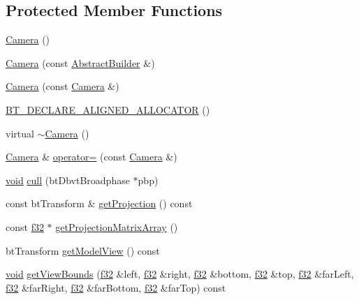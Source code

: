 \subsection*{Protected Member Functions}
\begin{DoxyCompactItemize}
\item 
\mbox{\hyperlink{classnjli_1_1_camera_a6b242e7ea1b008c3073fea985ac01bc7}{Camera}} ()
\item 
\mbox{\hyperlink{classnjli_1_1_camera_a82db3cd7c219d8f76d06278f410a8c1d}{Camera}} (const \mbox{\hyperlink{classnjli_1_1_abstract_builder}{Abstract\+Builder}} \&)
\item 
\mbox{\hyperlink{classnjli_1_1_camera_a865e8f65462a466b6e2e8c8c98e2d34b}{Camera}} (const \mbox{\hyperlink{classnjli_1_1_camera}{Camera}} \&)
\item 
\mbox{\hyperlink{classnjli_1_1_camera_a83f596c774d17aefbe44d3506d42da5d}{B\+T\+\_\+\+D\+E\+C\+L\+A\+R\+E\+\_\+\+A\+L\+I\+G\+N\+E\+D\+\_\+\+A\+L\+L\+O\+C\+A\+T\+OR}} ()
\item 
virtual \mbox{\hyperlink{classnjli_1_1_camera_a9dddc84821aa7508c5fdc5a1c03354f9}{$\sim$\+Camera}} ()
\item 
\mbox{\hyperlink{classnjli_1_1_camera}{Camera}} \& \mbox{\hyperlink{classnjli_1_1_camera_ad005a1f88da76bf5349fa374889ba0ce}{operator=}} (const \mbox{\hyperlink{classnjli_1_1_camera}{Camera}} \&)
\item 
\mbox{\hyperlink{_thread_8h_af1e856da2e658414cb2456cb6f7ebc66}{void}} \mbox{\hyperlink{classnjli_1_1_camera_a9919eed4f61256bb04551ac64d6aadcf}{cull}} (bt\+Dbvt\+Broadphase $\ast$pbp)
\item 
const bt\+Transform \& \mbox{\hyperlink{classnjli_1_1_camera_a3c26254e5f1217ba465f37054e862bef}{get\+Projection}} () const
\item 
const \mbox{\hyperlink{_util_8h_a5f6906312a689f27d70e9d086649d3fd}{f32}} $\ast$ \mbox{\hyperlink{classnjli_1_1_camera_ad3ce75d9af1a7cc5468a371f211b51f4}{get\+Projection\+Matrix\+Array}} ()
\item 
bt\+Transform \mbox{\hyperlink{classnjli_1_1_camera_a7a6900fc5cfeca389052ba88c06564b7}{get\+Model\+View}} () const
\item 
\mbox{\hyperlink{_thread_8h_af1e856da2e658414cb2456cb6f7ebc66}{void}} \mbox{\hyperlink{classnjli_1_1_camera_a8a2fe20126d6962fc65b55328905acc0}{get\+View\+Bounds}} (\mbox{\hyperlink{_util_8h_a5f6906312a689f27d70e9d086649d3fd}{f32}} \&left, \mbox{\hyperlink{_util_8h_a5f6906312a689f27d70e9d086649d3fd}{f32}} \&right, \mbox{\hyperlink{_util_8h_a5f6906312a689f27d70e9d086649d3fd}{f32}} \&bottom, \mbox{\hyperlink{_util_8h_a5f6906312a689f27d70e9d086649d3fd}{f32}} \&top, \mbox{\hyperlink{_util_8h_a5f6906312a689f27d70e9d086649d3fd}{f32}} \&far\+Left, \mbox{\hyperlink{_util_8h_a5f6906312a689f27d70e9d086649d3fd}{f32}} \&far\+Right, \mbox{\hyperlink{_util_8h_a5f6906312a689f27d70e9d086649d3fd}{f32}} \&far\+Bottom, \mbox{\hyperlink{_util_8h_a5f6906312a689f27d70e9d086649d3fd}{f32}} \&far\+Top) const

\end{DoxyCompactItemize}
